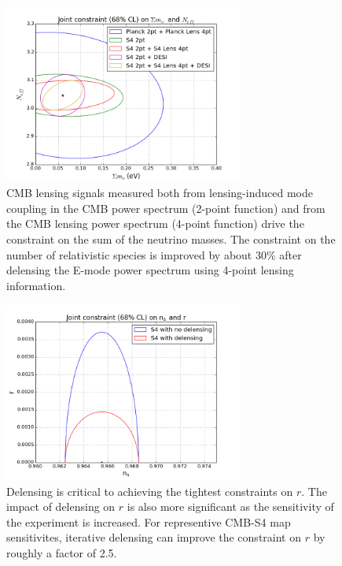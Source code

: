 \vspace{0.3cm}
\begin{figure}[htbp]
\centering
\includegraphics[width=0.7\textwidth]{CMBLensing/Neff_Mnu.png}
\caption{CMB lensing signals measured both from lensing-induced mode coupling in the CMB power spectrum (2-point function) and from the CMB lensing power spectrum (4-point function) drive the constraint on the sum of the neutrino masses.  The constraint on the number of relativistic species is improved by about 30\% after delensing the E-mode power spectrum using 4-point lensing information.}
\label{neutrinos}
\end{figure}

\begin{figure}[htbp]
\centering
\includegraphics[width=0.7\textwidth]{CMBLensing/inflation.png}
\caption{Delensing is critical to achieving the tightest constraints on $r$.  The impact of delensing on $r$ is also more significant as the sensitivity of the experiment is increased. For representive CMB-S4 map sensitivites, iterative delensing can improve the constraint on $r$ by roughly a factor of 2.5.}
\label{inflation}
\end{figure}


